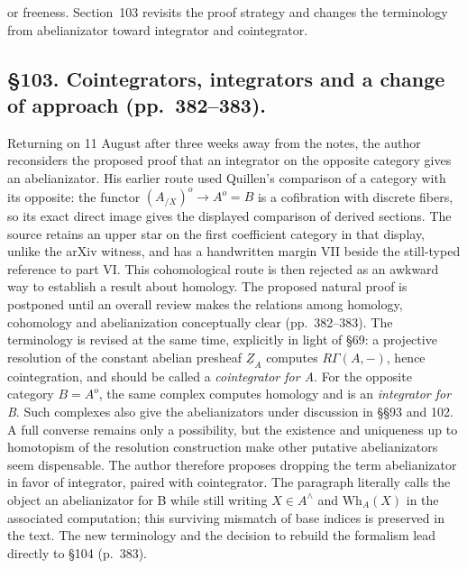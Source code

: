 \documentclass[10pt,oneside]{book}
\begin{document}
or freeness. Section~103 revisits the proof strategy and changes the terminology from abelianizator toward integrator and cointegrator.

\subsection*{\S103. Cointegrators, integrators and a change of approach (pp.\ 382--383).}
Returning on 11 August after three weeks away from the notes, the author reconsiders the proposed proof that an integrator on the opposite category gives an abelianizator. His earlier route used Quillen's comparison of a category with its opposite: the functor $(A_{/X})^o\to A^o=B$ is a cofibration with discrete fibers, so its exact direct image gives the displayed comparison of derived sections. The source retains an upper star on the first coefficient category in that display, unlike the arXiv witness, and has a handwritten margin VII beside the still-typed reference to part VI. This cohomological route is then rejected as an awkward way to establish a result about homology. The proposed natural proof is postponed until an overall review makes the relations among homology, cohomology and abelianization conceptually clear (pp.\ 382--383). The terminology is revised at the same time, explicitly in light of \S69: a projective resolution of the constant abelian presheaf $\underline Z_A$ computes $R\Gamma(A,-)$, hence cointegration, and should be called a \emph{cointegrator for A}. For the opposite category $B=A^o$, the same complex computes homology and is an \emph{integrator for B}. Such complexes also give the abelianizators under discussion in \S\S93 and 102. A full converse remains only a possibility, but the existence and uniqueness up to homotopism of the resolution construction make other putative abelianizators seem dispensable. The author therefore proposes dropping the term abelianizator in favor of integrator, paired with cointegrator. The paragraph literally calls the object an abelianizator for B while still writing $X\in A^\wedge$ and $\mathrm{Wh}_A(X)$ in the associated computation; this surviving mismatch of base indices is preserved in the text. The new terminology and the decision to rebuild the formalism lead directly to \S104 (p.\ 383).
\end{document}
